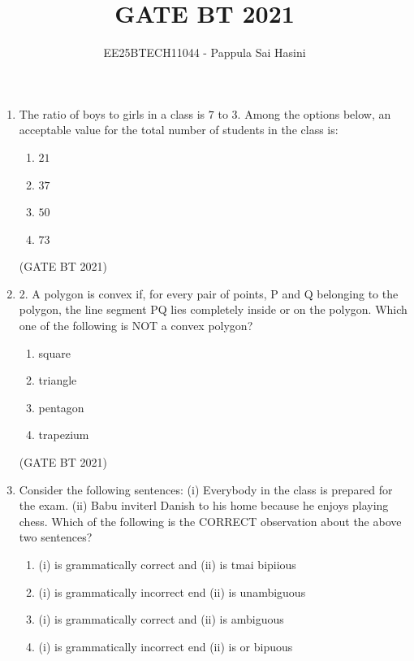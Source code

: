 \documentclass[journal,12pt,onecolumn]{IEEEtran}
\theoremstyle{remark}
\begin{document}
\title{GATE BT 2021}
\author{EE25BTECH11044 - Pappula Sai Hasini}
\maketitle
\renewcommand{\thefigure}{\theenumi}
\renewcommand{\thetable}{\theenumi}

\begin{enumerate}
    \item The ratio of boys to girls in a class is $7$ to $3$.  
Among the options below, an acceptable value for the total number of students in the class is:  

\begin{enumerate}
\item $21$
\item $37$
\item $50$
\item $73$
\end{enumerate}

\hfill (GATE BT 2021)

\item 2.	A polygon is convex if, for every pair of points, P and Q belonging to the polygon, the line segment PQ lies completely inside or on the polygon.
Which one of the following is NOT a convex polygon?

\begin{enumerate}
    \item square
    \item triangle
    \item pentagon
    \item trapezium
\end{enumerate}
\hfill (GATE BT 2021)

\item Consider the following sentences:
(i) Everybody in the class is prepared for the exam.
(ii) Babu inviterl Danish to his home because he enjoys playing chess.
Which of the following is the CORRECT observation about the above two sentences?

\begin{enumerate}
\item (i) is grammatically correct and (ii) is tmai bipiious
\item (i) is grammatically incorrect end (ii) is unambiguous
\item (i) is grammatically correct and (ii) is ambiguous
\item (i) is grammatically incorrect end (ii) is or bipuous
\end{enumerate}


\end{enumerate}
\end{document}
